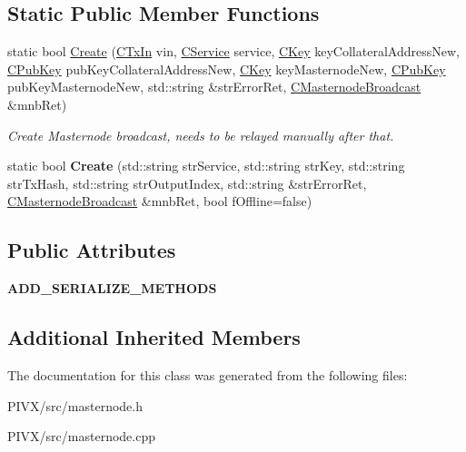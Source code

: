 \subsection*{Static Public Member Functions}
\begin{DoxyCompactItemize}
\item 
\mbox{\label{class_c_masternode_broadcast_a3b331bac6aa4ab8ece112b62243f7498}} 
static bool \mbox{\hyperlink{class_c_masternode_broadcast_a3b331bac6aa4ab8ece112b62243f7498}{Create}} (\mbox{\hyperlink{class_c_tx_in}{C\+Tx\+In}} vin, \mbox{\hyperlink{class_c_service}{C\+Service}} service, \mbox{\hyperlink{class_c_key}{C\+Key}} key\+Collateral\+Address\+New, \mbox{\hyperlink{class_c_pub_key}{C\+Pub\+Key}} pub\+Key\+Collateral\+Address\+New, \mbox{\hyperlink{class_c_key}{C\+Key}} key\+Masternode\+New, \mbox{\hyperlink{class_c_pub_key}{C\+Pub\+Key}} pub\+Key\+Masternode\+New, std\+::string \&str\+Error\+Ret, \mbox{\hyperlink{class_c_masternode_broadcast}{C\+Masternode\+Broadcast}} \&mnb\+Ret)
\begin{DoxyCompactList}\small\item\em Create Masternode broadcast, needs to be relayed manually after that. \end{DoxyCompactList}\item 
\mbox{\label{class_c_masternode_broadcast_a5b999adcbdb1de059cb226f3367771b0}} 
static bool {\bfseries Create} (std\+::string str\+Service, std\+::string str\+Key, std\+::string str\+Tx\+Hash, std\+::string str\+Output\+Index, std\+::string \&str\+Error\+Ret, \mbox{\hyperlink{class_c_masternode_broadcast}{C\+Masternode\+Broadcast}} \&mnb\+Ret, bool f\+Offline=false)
\end{DoxyCompactItemize}
\subsection*{Public Attributes}
\begin{DoxyCompactItemize}
\item 
\mbox{\label{class_c_masternode_broadcast_a3b423bd09c06dbb8b75dc06d3d34a4b0}} 
{\bfseries A\+D\+D\+\_\+\+S\+E\+R\+I\+A\+L\+I\+Z\+E\+\_\+\+M\+E\+T\+H\+O\+DS}
\end{DoxyCompactItemize}
\subsection*{Additional Inherited Members}


The documentation for this class was generated from the following files\+:\begin{DoxyCompactItemize}
\item 
P\+I\+V\+X/src/masternode.\+h\item 
P\+I\+V\+X/src/masternode.\+cpp\end{DoxyCompactItemize}
